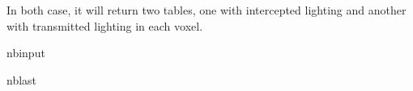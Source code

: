 \documentclass[letterpaper,10pt,english]{sphinxmanual}
\begin{document}
\sphinxAtStartPar
In both case, it will return two tables, one with intercepted lighting and another with transmitted lighting in each voxel.

\begin{sphinxuseclass}{nbinput}
\begin{sphinxuseclass}{nblast}
{
\begin{sphinxVerbatim}[commandchars=\\\{\}]
\llap{\color{nbsphinxin}[13]:\,\hspace{\fboxrule}\hspace{\fboxsep}}
  \PYG{p}{[}\PYG{p}{]}  
  \PYG{p}{[}  \PYG{p}{]}
  \PYG{p}{[}  \PYG{p}{]}
\end{sphinxVerbatim}
}

\end{sphinxuseclass}
\end{sphinxuseclass}
\end{document}

